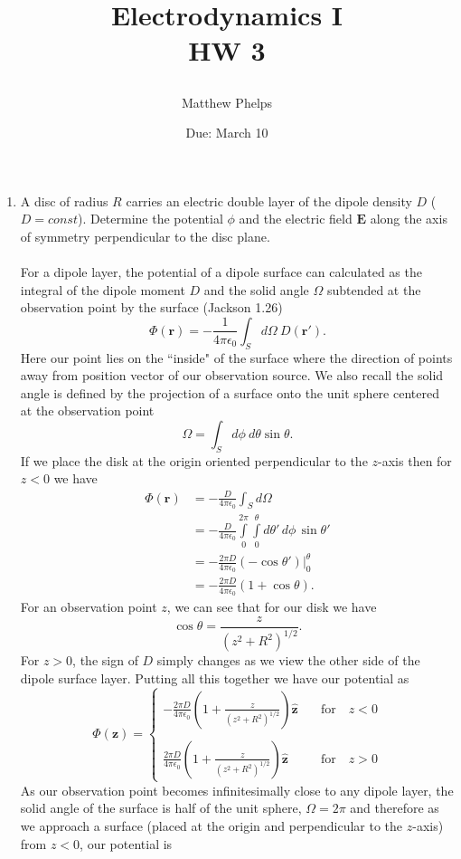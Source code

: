 \documentclass[11pt,letterpaper]{article}
\title{\begin{spacing}{1.2}Electrodynamics I\\HW 3\end{spacing}}
\author{Matthew Phelps}
\date{Due: March 10}
\newcommand{\vect}[1]{\mathbf{#1}}
\newcommand{\vecth}[1]{\hat{\mathbf{#1}}}
\newcommand{\epo}{\epsilon_0}
\begin{document}
\maketitle
\begin{enumerate}
\item
A disc of radius $R$ carries an electric double layer of the dipole density $D$ ($D=const$). Determine the potential $\phi$ and the electric field $\vect E$ along the axis of symmetry perpendicular to the disc plane.
\\ \\For a dipole layer, the potential of a dipole surface can calculated as the integral of the dipole moment $D$ and the solid angle $\Omega$ subtended at the observation point by the surface (Jackson 1.26)
$$\Phi(\vect r) = -\frac{1}{4\pi\epo}\int_S{d\Omega\ D(\vect r')}.$$
Here our point lies on the ``inside" of the surface where the direction of points away from position vector of our observation source. We also recall the solid angle is defined by the projection of a surface onto the unit sphere centered at the observation point
$$\Omega = \int_S{d\phi\ d\theta \sin\theta}.$$
If we place the disk at the origin oriented perpendicular to the $z$-axis then for $z<0$ we have
\begin{align*}\Phi(\vect r) &= -\frac{D}{4\pi\epo}\int_S{d\Omega}\\
&= -\frac{D}{4\pi\epo}\int\limits_0^{2\pi} \int\limits_0^{\theta}d\theta'\,d\phi\,\sin\theta'\\
&= -\frac{2\pi D}{4\pi\epo}(-\cos\theta')|_0^{\theta}\\
&=  -\frac{2\pi D}{4\pi\epo}(1+\cos\theta).
\end{align*}
For an observation point $z$, we can see that for our disk we have
$$\cos\theta = \frac{z}{(z^2+R^2)^{1/2}}.$$
For $z>0$, the sign of $D$ simply changes as we view the other side of the dipole surface layer. Putting all this together we have our potential as
$$\Phi(\vect z) =\begin{cases}\displaystyle-\frac{2\pi D}{4\pi\epo}\left(1+\frac{z}{(z^2+R^2)^{1/2}}\right)\vecth z&\quad\text{for}\quad z< 0\\\\\displaystyle
\frac{2\pi D}{4\pi\epo}\left(1+\frac{z}{(z^2+R^2)^{1/2}}\right)\vecth z&\quad\text{for}\quad z> 0
\end{cases}$$
As our observation point becomes infinitesimally close to any dipole layer, the solid angle of the surface is half of the unit sphere, $\Omega = 2\pi$ and therefore as we approach a surface (placed at the origin and perpendicular to the $z$-axis) from $z<0$, our potential is 

\end{enumerate}
\end{document}
